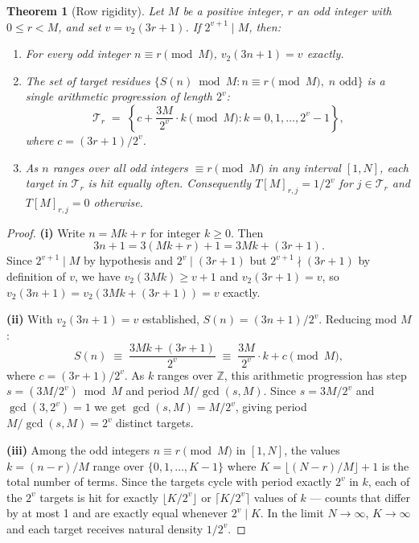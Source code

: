 \documentclass[12pt,a4paper]{article}
\newtheorem{theorem}{Theorem}
\newcommand{\Z}{\mathbb{Z}}
\begin{document}
\begin{theorem}[Row rigidity]
\label{thm:rigidity}
Let $M$ be a positive integer, $r$ an odd integer with $0 \leq r < M$, and
set $v = v_2(3r+1)$.  If $2^{v+1} \mid M$, then:
\begin{enumerate}
  \item[(i)] For every odd integer $n \equiv r \pmod{M}$, $v_2(3n+1) = v$ exactly.
  \item[(ii)] The set of target residues $\{S(n) \bmod M : n \equiv r \pmod{M},\;
        n \text{ odd}\}$ is a single arithmetic progression of length $2^v$:
        \[
          \mathcal{T}_r \;=\; \left\{ c + \frac{3M}{2^v}\cdot k \pmod{M}
          : k = 0, 1, \ldots, 2^v - 1 \right\},
        \]
        where $c = (3r+1)/2^v$.
  \item[(iii)] As $n$ ranges over all odd integers $\equiv r \pmod{M}$ in any
        interval $[1, N]$, each target in $\mathcal{T}_r$ is hit equally often.
        Consequently $T[M]_{r,j} = 1/2^v$ for $j \in \mathcal{T}_r$ and
        $T[M]_{r,j} = 0$ otherwise.
\end{enumerate}
\end{theorem}

\begin{proof}
\textbf{(i)} Write $n = Mk + r$ for integer $k \geq 0$.  Then
\[
  3n + 1 = 3(Mk+r)+1 = 3Mk + (3r+1).
\]
Since $2^{v+1} \mid M$ by hypothesis and $2^v \mid (3r+1)$ but $2^{v+1} \nmid
(3r+1)$ by definition of $v$, we have $v_2(3Mk) \geq v+1$ and $v_2(3r+1) = v$,
so $v_2(3n+1) = v_2(3Mk + (3r+1)) = v$ exactly.

\textbf{(ii)} With $v_2(3n+1) = v$ established, $S(n) = (3n+1)/2^v$.  Reducing
mod $M$:
\[
  S(n) \;\equiv\; \frac{3Mk + (3r+1)}{2^v} \;\equiv\; \frac{3M}{2^v}\cdot k + c
  \pmod{M},
\]
where $c = (3r+1)/2^v$.  As $k$ ranges over $\Z$, this arithmetic progression
has step $s = (3M/2^v) \bmod M$ and period $M / \gcd(s, M)$.  Since
$s = 3M/2^v$ and $\gcd(3, 2^v) = 1$ we get $\gcd(s, M) = M/2^v$, giving
period $M/\gcd(s,M) = 2^v$ distinct targets.

\textbf{(iii)} Among the odd integers $n \equiv r \pmod{M}$ in $[1,N]$, the
values $k = (n-r)/M$ range over $\{0, 1, \ldots, K-1\}$ where
$K = \lfloor(N-r)/M\rfloor + 1$ is the total number of terms.
Since the targets cycle with period exactly $2^v$ in $k$, each of the $2^v$
targets is hit for exactly $\lfloor K/2^v \rfloor$ or $\lceil K/2^v \rceil$
values of $k$ — counts that differ by at most 1 and are exactly equal whenever
$2^v \mid K$.  In the limit $N \to \infty$, $K \to \infty$ and each target
receives natural density $1/2^v$.
\end{proof}
\end{document}
